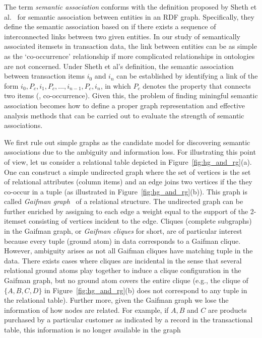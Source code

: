The term \emph{semantic association} conforms with the definition proposed by Sheth et al.~\cite{ShethEtal05JDBM} for semantic association between entities in an RDF graph. Specifically, they define the semantic association based on if there exists a sequence of interconnected links between two given entities. In our study of semantically associated itemsets in transaction data, the link between entities can be as simple as the `co-occurrence' relationship if more complicated relationships in ontologies are not concerned. Under Sheth et al’s definition, the semantic association between transaction items $i_0$ and $i_n$ can be established by identifying a link of the form $i_0, P_c, i_1, P_c, \ldots , i_{n−1}, P_c, i_n$, in which $P_c$ denotes the property that connects two items (\eg, co-occurrence). Given this, the problem of finding miningful semantic association becomes how to define a proper graph representation and effective analysis methods that can be carried out to evaluate the strength of semantic associations.  

We first rule out simple graphs as the candidate model for discovering semantic associations due to the ambiguity and information loss. For illustrating this point of view, let us consider a relational table depicted in Figure~\ref{fig:hg_and_rg}(a). One can construct a simple undirected graph where the set of vertices is the set of relational attributes (column items) and an edge joins two vertices if the they co-occur in a tuple (as illustrated in Figure~\ref{fig:hg_and_rg}(b)). This graph is called \emph{Gaifman graph}~\cite{Hodkinson02finiteconformal} of a relational structure. The undirected graph can be further enriched by assigning to each edge a weight equal to the support of the 2-itemset consisting of vertices incident to the edge. Cliques (complete subgraphs) in the Gaifman graph, or \emph{Gaifman cliques} for short, are of particular interest because every tuple (ground atom) in data corresponds to a Gaifman clique. However, ambiguity arises as not all Gaifman cliques have matching tuple in the data. There exists cases where cliques are incidental in the sense that several relational ground atoms play together to induce a clique configuration in the Gaifman graph, but no ground atom covers the entire clique (e.g., the clique of $\{A,B,C,D\}$ in Figure~\ref{fig:hg_and_rg}(b) does not correspond to any tuple in the relational table). Further more, given the Gaifman graph we lose the information of how nodes are related. For example, if $A, B$ and $C$ are products purchased by a particular customer as indicated by a record in the transactional table, this information is no longer available in the graph

